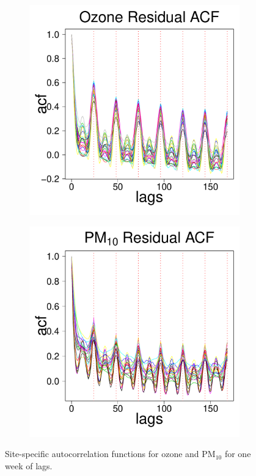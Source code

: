 \documentclass[alpha-refs]{wiley-article}
\begin{document}
{\begin{figure}[H]
\begin{center}
\begin{subfigure}[b]{.24\textwidth}
   \end{subfigure}
    \begin{subfigure}[b]{.24\textwidth}
     \includegraphics[width=\textwidth]{acf_o3_res.pdf}
   \end{subfigure}
     \begin{subfigure}[b]{.24\textwidth}
     \includegraphics[width=\textwidth]{acf_pm10_res.pdf}
   \end{subfigure}
  \end{center}
  \vspace{-4mm}
       \caption{Site-specific autocorrelation functions for ozone and $\text{PM}_{10}$ for one week of lags. }\label{fig:acf}
\end{figure}
}
\end{document}
